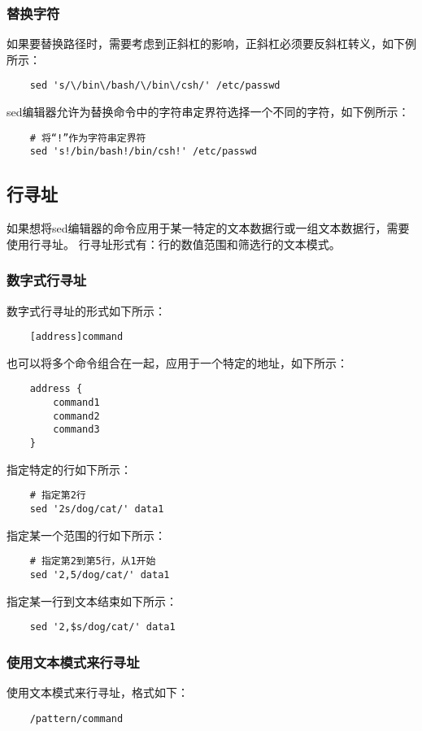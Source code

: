 \documentclass[a4paper,left=2.5cm,right=2.5cm,11pt]{article}
\begin{document}
\subsubsection{替换字符}
	如果要替换路径时，需要考虑到正斜杠的影响，正斜杠必须要反斜杠转义，如下例所示：
	\begin{lstlisting}
	sed 's/\/bin\/bash/\/bin\/csh/' /etc/passwd
	\end{lstlisting}

	sed编辑器允许为替换命令中的字符串定界符选择一个不同的字符，如下例所示：
	\begin{lstlisting}
	# 将“!”作为字符串定界符
	sed 's!/bin/bash!/bin/csh!' /etc/passwd
	\end{lstlisting}

\subsection{行寻址}
	如果想将sed编辑器的命令应用于某一特定的文本数据行或一组文本数据行，需要使用行寻址。
	行寻址形式有：行的数值范围和筛选行的文本模式。

\subsubsection{数字式行寻址}
	数字式行寻址的形式如下所示：
	\begin{lstlisting}
	[address]command
	\end{lstlisting}

	也可以将多个命令组合在一起，应用于一个特定的地址，如下所示：
	\begin{lstlisting}
	address {
		command1
		command2
		command3
	}
	\end{lstlisting}

	指定特定的行如下所示：
	\begin{lstlisting}
	# 指定第2行
	sed '2s/dog/cat/' data1
	\end{lstlisting}

	指定某一个范围的行如下所示：
	\begin{lstlisting}
	# 指定第2到第5行，从1开始
	sed '2,5/dog/cat/' data1
	\end{lstlisting}

	指定某一行到文本结束如下所示：
	\begin{lstlisting}
	sed '2,$s/dog/cat/' data1
	\end{lstlisting}

\subsubsection{使用文本模式来行寻址}
	使用文本模式来行寻址，格式如下：
	\begin{lstlisting}
	/pattern/command
	\end{lstlisting}
\end{document}
